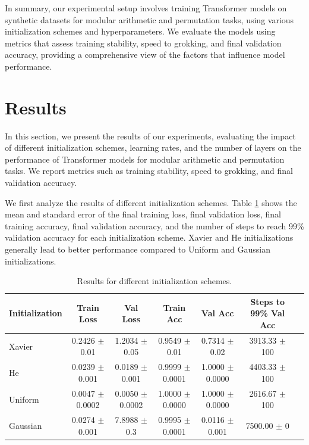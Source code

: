 \documentclass{article} %
\begin{document}
In summary, our experimental setup involves training Transformer models on synthetic datasets for modular arithmetic and permutation tasks, using various initialization schemes and hyperparameters. We evaluate the models using metrics that assess training stability, speed to grokking, and final validation accuracy, providing a comprehensive view of the factors that influence model performance.

\section{Results}
\label{sec:results}
In this section, we present the results of our experiments, evaluating the impact of different initialization schemes, learning rates, and the number of layers on the performance of Transformer models for modular arithmetic and permutation tasks. We report metrics such as training stability, speed to grokking, and final validation accuracy.

We first analyze the results of different initialization schemes. Table \ref{tab:init_schemes} shows the mean and standard error of the final training loss, final validation loss, final training accuracy, final validation accuracy, and the number of steps to reach 99\% validation accuracy for each initialization scheme. Xavier and He initializations generally lead to better performance compared to Uniform and Gaussian initializations.

\begin{table}[h]
    \centering
    \begin{tabular}{lcccccc}
        \toprule
        Initialization & Train Loss & Val Loss & Train Acc & Val Acc & Steps to 99\% Val Acc \\
        \midrule
        Xavier & 0.2426 $\pm$ 0.01 & 1.2034 $\pm$ 0.05 & 0.9549 $\pm$ 0.01 & 0.7314 $\pm$ 0.02 & 3913.33 $\pm$ 100 \\
        He & 0.0239 $\pm$ 0.001 & 0.0189 $\pm$ 0.001 & 0.9999 $\pm$ 0.0001 & 1.0000 $\pm$ 0.0000 & 4403.33 $\pm$ 100 \\
        Uniform & 0.0047 $\pm$ 0.0002 & 0.0050 $\pm$ 0.0002 & 1.0000 $\pm$ 0.0000 & 1.0000 $\pm$ 0.0000 & 2616.67 $\pm$ 100 \\
        Gaussian & 0.0274 $\pm$ 0.001 & 7.8988 $\pm$ 0.3 & 0.9995 $\pm$ 0.0001 & 0.0116 $\pm$ 0.001 & 7500.00 $\pm$ 0 \\
        \bottomrule
    \end{tabular}
    \caption{Results for different initialization schemes.}
    \label{tab:init_schemes}
\end{table}
\end{document}
